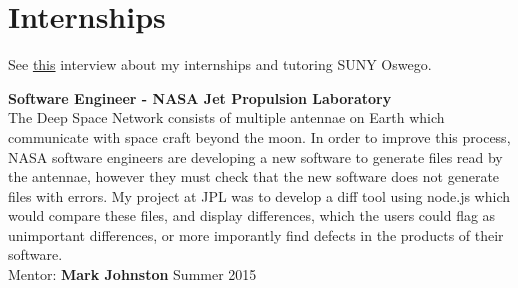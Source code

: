 \documentclass[8pt]{article}
\renewenvironment{itemize}{
  \begin{list}{}{
    \setlength{\leftmargin}{1.5em}
  }
}{
  \end{list}
}
\begin{document}
\section*{Internships} See \href{https://www.youtube.com/watch?v=BiJOjhm_ov4}{this} interview about my internships and tutoring SUNY Oswego.
\begin{itemize}
\item \textbf{Software Engineer - NASA Jet Propulsion Laboratory}\\
  The Deep Space Network consists of multiple antennae on Earth which communicate with space craft beyond the moon. In order to improve this process, NASA software engineers are developing a new software to generate files read by the antennae, however they must check that the new software does not generate files with errors. My project at JPL was to develop a diff tool using node.js which would compare these files, and display differences, which the users could flag as unimportant differences, or more imporantly find defects in the products of their software.\\
  Mentor: \textbf{Mark Johnston} \hfill Summer 2015


\end{itemize}




\end{document}

